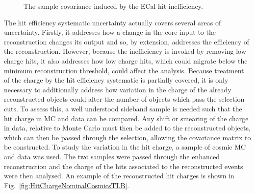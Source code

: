 \begin{figure}%
  \centering
  \caption{The sample covariance induced by the ECal hit inefficiency.}
  \label{fig:ECalThresholdCovarianceMatrices}
\end{figure}
\newline
\newline
The hit efficiency systematic uncertainty actually covers several areas of uncertainty.  Firstly, it addresses how a change in the core input to the reconstruction changes its output and so, by extension, addresses the efficiency of the reconstruction.  However, because the inefficiency is invoked by removing low charge hits, it also addresses how low charge hits, which could migrate below the minimum reconstruction threshold, could affect the analysis.  Because treatment of the charge by the hit efficiency systematic is partially covered, it is only necessary to additionally address how variation in the charge of the already reconstructed objects could alter the number of objects which pass the selection cuts.  To assess this, a well understood sideband sample is needed such that the hit charge in MC and data can be compared.  Any shift or smearing of the charge in data, relative to Monte Carlo must then be added to the reconstructed objects, which can then be passed through the selection, allowing the covariance matrix to be constructed.  To study the variation in the hit charge, a sample of cosmic MC and data was used.  The two samples were passed through the enhanced reconstruction and the charge of the hits associated to the reconstructed events were then analysed.  An example of the reconstructed hit charges is shown in Fig.~\ref{fig:HitChargeNominalCosmicsTLB}.  

